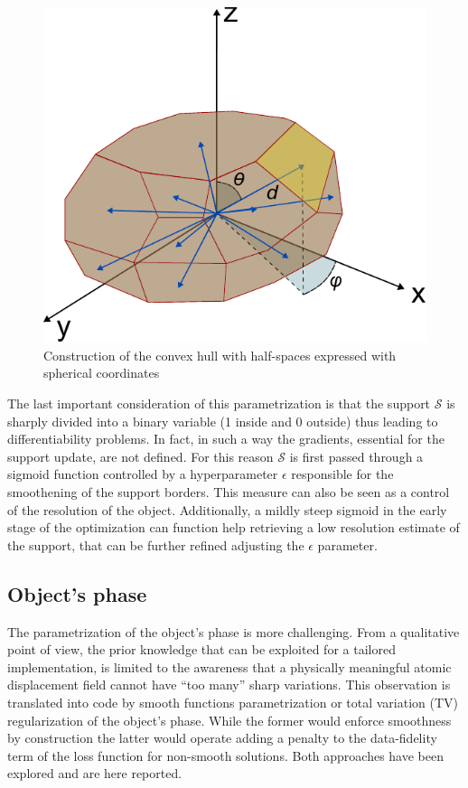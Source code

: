 \begin{figure}[H]
    \centering
    \includegraphics[width=.8\textwidth]{figures/AD/AD.pdf}
    \caption{Construction of the convex hull with half-spaces expressed with spherical coordinates }
    \label{fig:support_construction}
\end{figure}

The last important consideration of this parametrization is that the support $\mathcal S$ is sharply divided into a binary 
variable (1 inside and 0 outside) thus leading to differentiability problems. In fact, in such a way the gradients, essential for the 
support update, are not defined. For this reason $\mathcal S$ is first passed through a sigmoid function controlled by a
hyperparameter $\epsilon$ responsible for the smoothening of the support borders. This measure can also be seen as a control of the 
resolution of the object. Additionally, a mildly steep sigmoid in the early stage of the optimization can function help retrieving 
a low resolution estimate of the support, that can be further refined adjusting the $\epsilon$ parameter. \\

\subsection{Object's phase}
The parametrization of the object's phase is more challenging. From a qualitative point of view, the prior knowledge 
that can be exploited for a tailored implementation, is limited to the awareness that a physically meaningful atomic displacement 
field cannot have ``too many'' sharp variations. This observation is translated into code by smooth functions parametrization or total 
variation (TV) regularization of the object's phase. While the former would enforce smoothness by construction the latter 
would operate adding a penalty to the data-fidelity term of the loss function for non-smooth solutions. Both approaches have been 
explored and are here reported. \\

